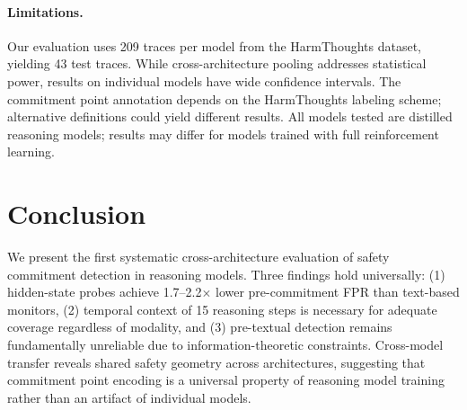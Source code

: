 \documentclass[11pt,a4paper]{article}
\begin{document}
\paragraph{Limitations.}
Our evaluation uses 209 traces per model from the HarmThoughts dataset, yielding 43 test traces. While cross-architecture pooling addresses statistical power, results on individual models have wide confidence intervals. The commitment point annotation depends on the HarmThoughts labeling scheme; alternative definitions could yield different results. All models tested are distilled reasoning models; results may differ for models trained with full reinforcement learning.

\section{Conclusion}

We present the first systematic cross-architecture evaluation of safety commitment detection in reasoning models. Three findings hold universally: (1) hidden-state probes achieve 1.7--2.2$\times$ lower pre-commitment FPR than text-based monitors, (2) temporal context of 15 reasoning steps is necessary for adequate coverage regardless of modality, and (3) pre-textual detection remains fundamentally unreliable due to information-theoretic constraints. Cross-model transfer reveals shared safety geometry across architectures, suggesting that commitment point encoding is a universal property of reasoning model training rather than an artifact of individual models.
\end{document}
